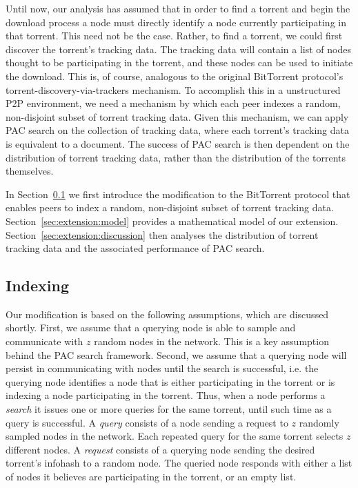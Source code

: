 Until now, our analysis has assumed that in order to find a torrent and begin the download process a node must directly identify a node currently participating in that torrent. This need not be the case. Rather, to find a torrent, we could first discover the torrent's tracking data. The tracking data will contain a list of nodes thought to be participating in the torrent, and these nodes can be used to initiate the download. This is, of course, analogous to the original BitTorrent protocol's torrent-discovery-via-trackers mechanism. To accomplish this in a unstructured P2P environment, we need a mechanism by which each peer indexes a random, non-disjoint subset of torrent tracking data. Given this mechanism, we can apply PAC search on the collection of tracking data, where each torrent's tracking data is equivalent to a document. The success of PAC search is then dependent on the distribution of torrent tracking data, rather than the distribution of the torrents themselves. 

In Section~\ref{sec:extension:indexing} we first introduce the modification to the BitTorrent protocol that enables peers to index a random, non-disjoint subset of torrent tracking data. Section~\ref{sec:extension:model} provides a mathematical model of our extension. Section~\ref{sec:extension:discussion} then analyses the distribution of torrent tracking data and the associated performance of PAC search.

\subsection{Indexing}\label{sec:extension:indexing}

    Our modification is based on the following assumptions, which are discussed shortly. First, we assume that a querying node is able to sample and communicate with $z$ random nodes in the network. This is a key assumption behind the PAC search framework. Second, we assume that a querying node will persist in communicating with nodes until the search is successful, i.e. the querying node identifies a node that is either participating in the torrent or is indexing a node participating in the torrent. Thus, when a node performs a {\em search} it issues one or more queries for the same torrent, until such time as a query is successful. A {\em query} consists of a node sending a request to $z$ randomly sampled nodes in the network. Each repeated query for the same torrent selects $z$ different nodes. A {\em request} consists of a querying node sending the desired torrent's infohash to a random node. The queried node responds with either a list of nodes it believes are participating in the torrent, or an empty list.

